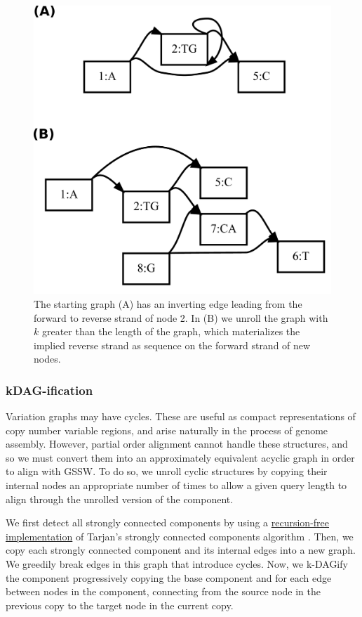 \documentclass[12pt]{article}
\begin{document}
\begin{figure}[t]
\centering
\includegraphics[width=1.0\textwidth]{figures/unfold}
\caption{\label{fig:unfold}
  The starting graph (A) has an inverting edge leading from the forward to reverse strand of node 2.
  In (B) we unroll the graph with $k$ greater than the length of the graph, which materializes the implied reverse strand as sequence on the forward strand of new nodes.
}
\end{figure}

\subsubsection{kDAG-ification}

Variation graphs may have cycles.
These are useful as compact representations of copy number variable regions, and arise naturally in the process of genome assembly.
However, partial order alignment cannot handle these structures, and so we must convert them into an approximately equivalent acyclic graph in order to align with GSSW.
To do so, we unroll cyclic structures by copying their internal nodes an appropriate number of times to allow a given query length to align through the unrolled version of the component.

We first detect all strongly connected components by using a \href{https://github.com/vgteam/vg/blob/fbcb6e62/src/vg.cpp#L3508-L3552}{recursion-free implementation} of Tarjan's strongly connected components algorithm \cite{tarjan1972depth}.
Then, we copy each strongly connected component and its internal edges into a new graph.
We greedily break edges in this graph that introduce cycles.
Now, we k-DAGify the component progressively copying the base component and for each edge between nodes in the component, connecting from the source node in the previous copy to the target node in the current copy.
\end{document}
